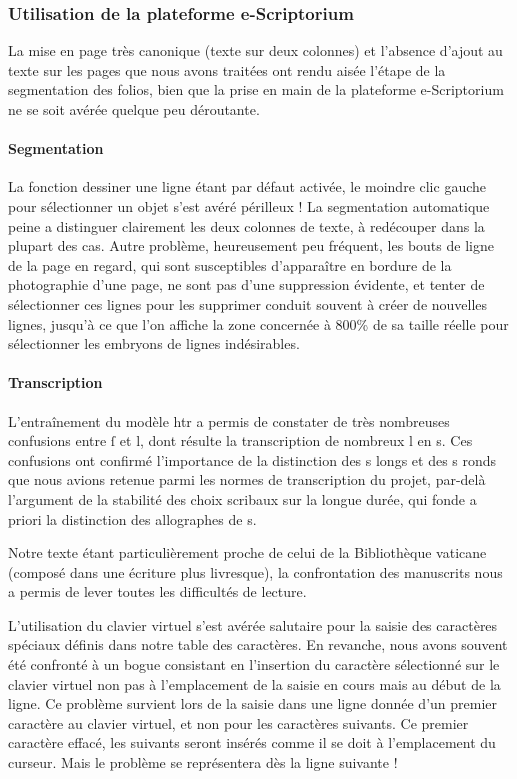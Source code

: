 \documentclass{article}
\begin{document}
	\subsubsection{Utilisation de la plateforme e-Scriptorium}
	La mise en page très canonique (texte sur deux colonnes) et l'absence d'ajout au texte sur les pages que nous avons traitées ont rendu aisée l'étape de la segmentation des folios, bien que la prise en main de la plateforme e-Scriptorium ne se soit avérée quelque peu déroutante.
	
	\paragraph{Segmentation}
	La fonction dessiner une ligne étant par défaut activée, le moindre clic gauche pour sélectionner un objet s'est avéré périlleux ! La segmentation automatique peine a distinguer clairement les deux colonnes de texte, à redécouper dans la plupart des cas. Autre problème, heureusement peu fréquent, les bouts de ligne de la page en regard, qui sont susceptibles d'apparaître en bordure de la photographie d'une page, ne sont pas d'une suppression évidente, et tenter de sélectionner ces lignes pour les supprimer conduit souvent à créer de nouvelles lignes, jusqu'à ce que l'on affiche la zone concernée à 800\% de sa taille réelle pour sélectionner les embryons de lignes indésirables.
	
	\paragraph{Transcription}
	L'entraînement du modèle \gls{htr} a permis de constater de très nombreuses confusions entre ſ et l, dont résulte la transcription de nombreux l en s. Ces confusions ont confirmé l'importance de la distinction des s longs et des s ronds que nous avions retenue parmi les normes de transcription du projet, par-delà l'argument de la stabilité des choix scribaux sur la longue durée, qui fonde a priori la distinction des allographes de s.
	
	Notre texte étant particulièrement proche de celui de la Bibliothèque vaticane (composé dans une écriture plus livresque), la confrontation des manuscrits nous a permis de lever toutes les difficultés de lecture.
	
	L'utilisation du clavier virtuel s'est avérée salutaire pour la saisie des caractères spéciaux définis dans notre table des caractères. En revanche, nous avons souvent été confronté à un bogue consistant en l'insertion du caractère sélectionné sur le clavier virtuel non pas à l'emplacement de la saisie en cours mais au début de la ligne. Ce problème survient lors de la saisie dans une ligne donnée d'un premier caractère au clavier virtuel, et non pour les caractères suivants. Ce premier caractère effacé, les suivants seront insérés comme il se doit à l'emplacement du curseur. Mais le problème se représentera dès la ligne suivante !
	
\end{document}
